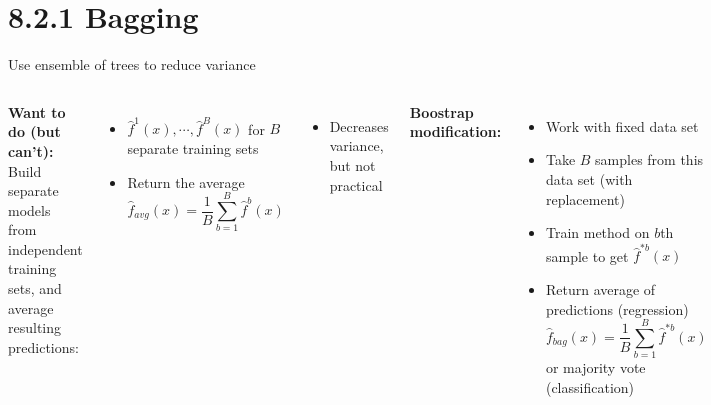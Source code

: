 \documentclass[aspectratio=169,usenames,dvipsnames]{beamer}
\newcommand{\InstructorList}[1]{
\begin{itemize}
	\color{orange}
	#1
\end{itemize}
}
\begin{document}
\section{8.2.1 Bagging}

\begin{frame}[t]{Use ensemble of trees to reduce variance}

\begin{columns}

\textbf{Want to do (but can't):} \\
Build separate models from independent training sets, and average resulting predictions:
\begin{itemize}
	\item $\hat f^1(x), \cdots, \hat f^B(x)$ for $B$ separate training sets
	\item Return the average
	\begin{equation*}
		\hat f_{avg}(x) = \frac{1}{B} \sum_{b=1}^B \hat f^b(x)
	\end{equation*}

\end{itemize}
\InstructorList{
  \item Decreases variance, but not practical
}


\textbf{Boostrap modification:}
\begin{itemize}
	\item Work with fixed data set
	\item Take $B$ samples from this data set (with replacement)
	\item Train method on $b$th sample to get $\hat f^{*b}(x)$
	\item Return average of predictions (regression)
	\begin{equation*}
		\hat f_{bag}(x) = \frac{1}{B} \sum_{b=1}^B \hat f^{*b}(x)
	\end{equation*}
	or majority vote (classification)
\end{itemize}



\end{columns}

\end{frame}
\end{document}
